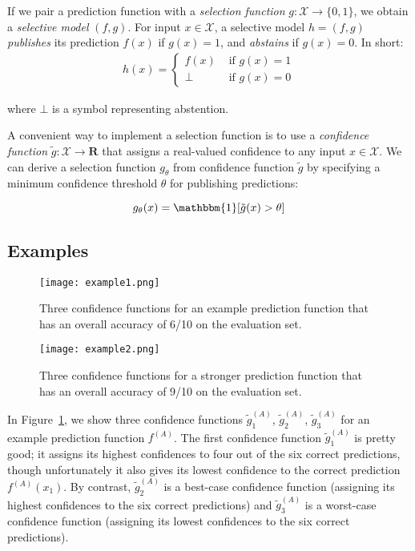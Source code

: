 \documentclass[11pt]{article}
\begin{document}
If we pair a prediction function with a \emph{selection function} $g: \mathcal{X} \rightarrow \{0,1\}$, we obtain a \emph{selective model} $(f,g)$. For input $x \in \mathcal{X}$, a selective model $h = (f,g)$ \emph{publishes} its prediction $f(x)$ if $g(x)=1$, and \emph{abstains} if $g(x)=0$. In short:
\begin{gather*}
h(x) = \begin{cases}
               f(x) &\mbox{ if } g(x)=1\\
               \bot &\mbox{ if } g(x)=0
       \end{cases}
\end{gather*}

\noindent where $\bot$ is a symbol representing abstention.

A convenient way to implement a selection function is to use a \emph{confidence function} $\tilde{g}: \mathcal{X} \rightarrow \mathbf{R}$ that assigns a real-valued confidence to any input $x \in \mathcal{X}$. We can derive a selection function $g_\theta$ from confidence function $\tilde{g}$ by specifying a minimum confidence threshold $\theta$ for publishing predictions:

\begin{equation}
g_\theta(x) = \mathbbm{1}[\tilde{g}(x) > \theta]
\end{equation}

\subsection{Examples}

\begin{figure}
\centering
\texttt{[image: example1.png]}
\caption{Three confidence functions for an example prediction function that has an overall accuracy of 6/10 on the evaluation set.}
\label{fig:example1}
\end{figure}

\begin{figure}
\centering
\texttt{[image: example2.png]}
\caption{Three confidence functions for a stronger prediction function that has an overall accuracy of 9/10 on the evaluation set.}
\label{fig:example2}
\end{figure}


In Figure~\ref{fig:example1}, we show three confidence functions $\tilde{g}_1^{(A)}$, $\tilde{g}_2^{(A)}$, $\tilde{g}_3^{(A)}$ for an example prediction function $f^{(A)}$. The first confidence function $\tilde{g}_1^{(A)}$ is pretty good; it assigns its highest confidences to four out of the six correct predictions, though unfortunately it also gives its lowest confidence to the correct prediction $f^{(A)}(x_1)$. By contrast, $\tilde{g}_2^{(A)}$ is a best-case confidence function (assigning its highest confidences to the six correct predictions) and $\tilde{g}_3^{(A)}$ is a worst-case confidence function (assigning its lowest confidences to the six correct predictions).
\end{document}
